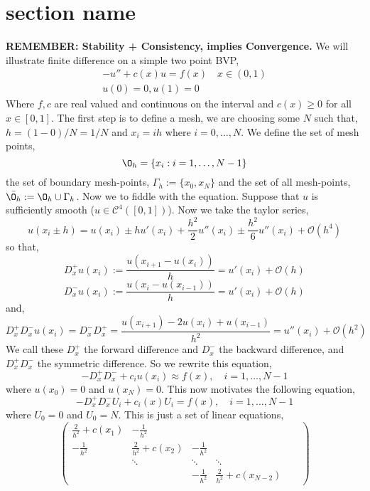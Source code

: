 
\section{section name}
\textbf{REMEMBER: Stability + Consistency, implies Convergence.}
We will illustrate finite difference on a simple two point BVP,
\begin{align*}
  - u'' + c(x)u = f(x) \quad x \in (0, 1)\\
  u(0) = 0, u(1) = 0
\end{align*}
Where $f, c$ are real valued and continuous on the interval and $c(x) \ge 0$ for all $x \in [0, 1]$. The first step is to define a mesh, we are choosing some $N$ such that, $h = (1 - 0)/N = 1/N$ and $x_i = ih$ where $i = 0, \dots, N$. We define the set of mesh points,
$$ \O_h = \{x_i : i = 1, \dots, N-1\} $$
the set of boundary mesh-points, $\Gamma_h := \{x_0, x_N\}$ and the set of all mesh-points, $\bar{\O_h} := \O_h \cup \Gamma_h$. Now we to fiddle with the equation. Suppose that $u$ is sufficiently smooth ($u \in \mathcal{C}^4([0, 1])$). Now we take the taylor series,
$$ u(x_i \pm h) = u(x_i) \pm hu'(x_i) + \frac{h^2}{2}u''(x_i) \pm \frac{h^2}{6}u''(x_i) + \mathcal{O}(h^4)$$
so that,
$$ D_x^+ u(x_i) := \frac{u(x_{i+1}- u(x_i))}{h} = u'(x_i) + \mathcal{O}(h) $$
$$ D_x^- u(x_i) := \frac{u(x_{i}- u(x_{i-1}))}{h} = u'(x_i) + \mathcal{O}(h) $$
and,
$$ D_x^+ D_x^- u(x_i) = D_x^-D_x^+ = \frac{u(x_{i+1}) - 2u(x_i) + u(x_{i-1})}{h^2} = u''(x_{i}) + \mathcal{O}(h^2) $$
We call these $D_x^+$ the forward difference and $D_x^-$ the backward difference, and $D_x^+ D_x^-$ the symmetric difference. So we rewrite this equation,
$$ -D_x^+D_x^- + c_i u(x_i) \approx f(x), \quad i = 1, \dots, N - 1 $$
where $u(x_0) = 0$ and $u(x_N) = 0$. This now motivates the following equation,
$$ -D_x^+D_x^-U_i + c_i(x) U_i = f(x), \quad i = 1, \dots, N-1$$
where $U_0 = 0$ and $U_0 = N$. This is just a set of linear equations,
$$ \begin{pmatrix}
  \frac{2}{h^2} + c(x_1) & -\frac{1}{h^2} &&& \\
  -\frac{1}{h^2} & \frac{2}{h^2} + c(x_2) & -\frac{1}{h^2} && \\
  & \ddots & \ddots & \ddots & \\
  && -\frac{1}{h^2} & \frac{2}{h^2} + c(x_{N-2})  &&
\end{pmatrix} $$

